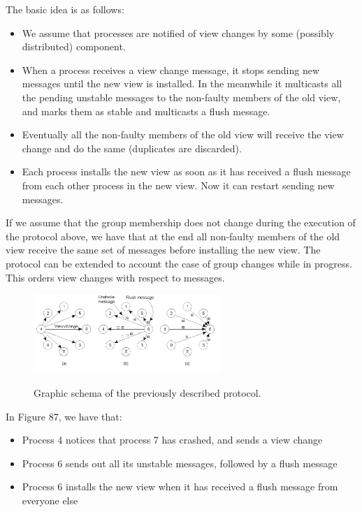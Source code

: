 \documentclass[10pt,a4paper]{article}
\begin{document}
The basic idea is as follows:
\begin{itemize}
 	\item We assume that processes are notified of view changes by some (possibly distributed) component.
 	\item When a process receives a view change message, it stops sending new messages until the new view is installed. In the meanwhile it multicasts all the pending unstable messages to the non-faulty members of the old view, and marks them as stable and multicasts a flush message.
 	\item Eventually all the non-faulty members of the old view will receive the view change and do the same (duplicates are discarded).
 	\item Each process installs the new view as soon as it has received a flush message from each other process in the new view. Now it can restart sending new messages.
\end{itemize}
If we assume that the group membership does not change during the execution of the protocol above, we have that at the end all non-faulty members of the old view receive the same set of messages before installing the new view. The protocol can be extended to account the case of group changes while in progress. This orders view changes with respect to messages.
\begin{figure}[h!]
\hfill \includegraphics[width=200pt]{images/vs-imple.png}\hspace*{\fill}
  \label{fig:vs-imple}
  \caption{Graphic schema of the previously described protocol.}
\end{figure}
In Figure 87, we have that:
\begin{itemize}
	\item Process 4 notices that process 7 has crashed, and sends a view change
	\item Process 6 sends out all its unstable messages, followed by a flush message
	\item Process 6 installs the new view when it has received a flush message from everyone else
\end{itemize}
\end{document}
